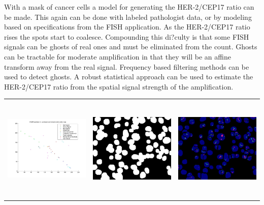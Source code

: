With a mask of cancer cells a model for generating the HER-2/CEP17 ratio can be made. This again can be done with labeled pathologist data, or by modeling based on specifications from the FISH application. As the HER-2/CEP17 ratio rises the spots start to coalesce. Compounding this di?culty is that some FISH signals can be ghosts of real ones and must be eliminated from the count. Ghosts can be tractable for moderate amplification in that they will be an affine transform away from the real signal. Frequency based filtering methods can be used to detect ghosts. A robust statistical approach can be used to estimate the HER-2/CEP17 ratio from the spatial signal strength of the amplification.

\begin{tabular}{ |c|c|c| }
\includegraphics[width=5.0cm,height=5.0cm]{images/Her2Fish/1_abConvexHull.jpg}  &
\includegraphics[width=5.0cm,height=5.0cm]{images/Her2Fish/1_Processedlabelimage.jpg}   &
\includegraphics[width=5.0cm,height=5.0cm]{images/Her2Fish/1_RGBMASK.jpg}  \\

\end{tabular}
